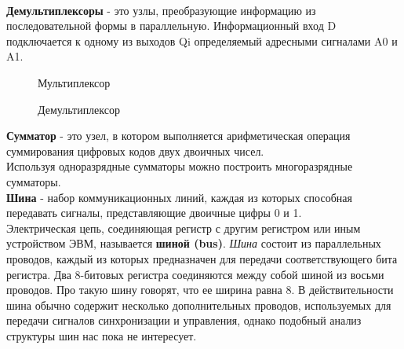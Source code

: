 \\\textbf{Демультиплексоры} - это узлы, преобразующие информацию из последовательной формы в параллельную. Информационный вход D подключается к одному из выходов Qi определяемый адресными сигналами A0 и A1.
\begin{figure}[!h]
\begin{minipage}[c]{6cm}
\center{\texttt{[image: 10\_4]}}
\caption{Мультиплексор}
\end{minipage}
\hfill
\begin{minipage}[c]{6cm}
\center{\texttt{[image: 10\_5]}}
\caption{Демультиплексор}
\end{minipage}
\end{figure}

\textbf{Сумматор} - это узел, в котором выполняется арифметическая операция суммирования цифровых кодов двух двоичных чисел.
\\Используя одноразрядные сумматоры можно построить многоразрядные сумматоры.
\\\textbf{Шина} - набор коммуникационных линий, каждая из которых способная передавать сигналы, представляющие двоичные цифры 0 и 1. 
\\Электрическая цепь, соединяющая регистр с другим регистром или иным устройством ЭВМ, называется \textbf{шиной (bus)}. \emph{Шина} состоит из параллельных проводов, каждый из которых предназначен для передачи соответствующего бита регистра. Два 8-битовых регистра соединяются между собой шиной из восьми проводов. Про такую шину говорят, что ее ширина равна 8. В действительности шина обычно содержит несколько дополнительных проводов, используемых для передачи сигналов синхронизации и управления, однако подобный анализ структуры шин нас пока не интересует.
